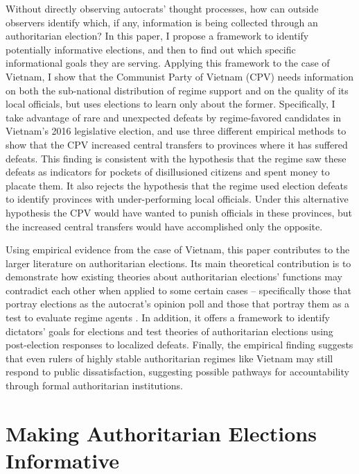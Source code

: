 \documentclass[12pt]{article}
\newcommand{\1}{\mathbbm{1}}
\begin{document}
Without directly observing autocrats' thought processes, how can outside observers identify which, if any, information is being collected through an authoritarian election? In this paper, I propose a framework to identify potentially informative elections, and then to find out which specific informational goals they are serving. Applying this framework to the case of Vietnam, I show that the Communist Party of Vietnam (CPV) needs information on both the sub-national distribution of regime support and on the quality of its local officials, but uses elections to learn only about the former. Specifically, I take advantage of rare and unexpected defeats by regime-favored candidates in Vietnam's 2016 legislative election, and use three different empirical methods to show that the CPV increased central transfers to provinces where it has suffered defeats. This finding is consistent with the hypothesis that the regime saw these defeats as indicators for pockets of disillusioned citizens and spent money to placate them. It also rejects the hypothesis that the regime used election defeats to identify provinces with under-performing local officials. Under this alternative hypothesis the CPV would have wanted to punish officials in these provinces, but the increased central transfers would have accomplished only the opposite.

Using empirical evidence from the case of Vietnam, this paper contributes to the larger literature on authoritarian elections. Its main theoretical contribution is to demonstrate how existing theories about authoritarian elections' functions may contradict each other when applied to some certain cases -- specifically those that portray elections as the autocrat's opinion poll \citep[e.g.][]{Miller2015, Magaloni2006, Blaydes2010} and those that portray them as a test to evaluate regime agents \citep[e.g.][]{Magaloni2006, Blaydes2010,Myagkov2009,RundlettSvolik2016}. In addition, it offers a framework to identify dictators' goals for elections and test theories of authoritarian elections using post-election responses to localized defeats. Finally, the empirical finding suggests that even rulers of highly stable authoritarian regimes like Vietnam may still respond to public dissatisfaction, suggesting possible pathways for accountability through formal authoritarian institutions.

\section{Making Authoritarian Elections Informative}
\label{sec:lit_review}
\end{document}
